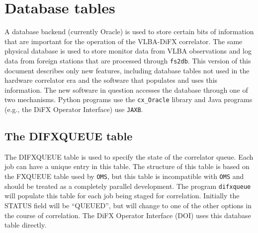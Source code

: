 \section{Database tables} \label{sec:database}


A database backend (currently Oracle) is used to store certain bits of information that are important for the operation of the VLBA-DiFX correlator.
The same physical database is used to store monitor data from VLBA observations and log data from foreign stations that are processed through {\tt fs2db}.
This version of this document describes only new features, including database tables not used in the hardware correlator era and the
software that populates and uses this information.
The new software in question accesses the database through one of two mechanisms.  
Python programs use the {\tt cx\_Oracle} library and Java programs (e.g., the DiFX Operator Interface) use {\tt JAXB}.

\subsection{The DIFXQUEUE table}

The DIFXQUEUE table is used to specify the state of the correlator queue.
Each job can have a unique entry in this table.
The structure of this table is based on the FXQUEUE table used by {\tt OMS}, but this table is incompatible with {\tt OMS} and should be treated as a completely parallel development.
The program {\tt difxqueue} will populate this table for each job being staged for correlation.
Initially the STATUS field will be ``QUEUED'', but will change to one of the other options in the course of correlation.
The DiFX Operator Interface (DOI) uses this database table directly.

